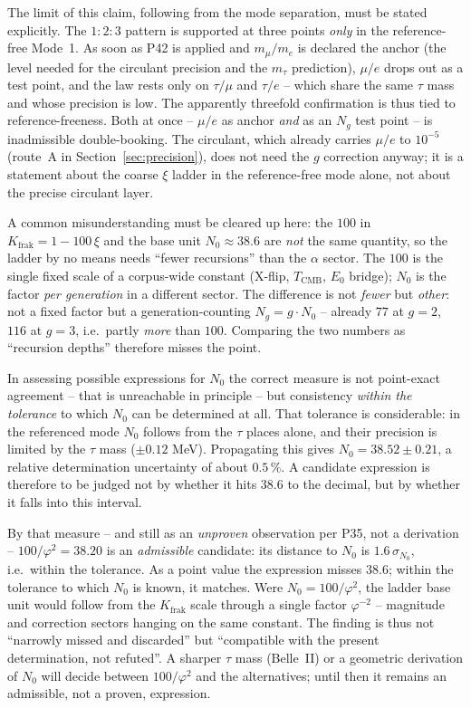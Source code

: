 The limit of this claim, following from the mode separation, must be stated
explicitly. The $1:2:3$ pattern is supported at three points \emph{only} in
the reference-free Mode~1. As soon as P42 is applied and $m_\mu/m_e$ is
declared the anchor (the level needed for the circulant precision and the
$m_\tau$ prediction), $\mu/e$ drops out as a test point, and the law rests
only on $\tau/\mu$ and $\tau/e$ -- which share the same $\tau$ mass and whose
precision is low. The apparently threefold confirmation is thus tied to
reference-freeness. Both at once -- $\mu/e$ as anchor \emph{and} as an
$N_g$ test point -- is inadmissible double-booking. The circulant, which
already carries $\mu/e$ to $10^{-5}$ (route~A in
Section~\ref{sec:precision}), does not need the $g$ correction anyway; it is
a statement about the coarse $\xi$ ladder in the reference-free mode alone,
not about the precise circulant layer.

A common misunderstanding must be cleared up here: the $100$ in
$K_{\text{frak}}=1-100\,\xi$ and the base unit $N_0\approx38.6$ are
\emph{not} the same quantity, so the ladder by no means needs \enquote{fewer
recursions} than the $\alpha$ sector. The $100$ is the single fixed scale of
a corpus-wide constant (X-flip, $T_{\text{CMB}}$, $E_0$ bridge); $N_0$ is the
factor \emph{per generation} in a different sector. The difference is not
\emph{fewer} but \emph{other}: not a fixed factor but a generation-counting
$N_g=g\cdot N_0$ -- already $77$ at $g=2$, $116$ at $g=3$, i.e.\ partly
\emph{more} than $100$. Comparing the two numbers as \enquote{recursion
depths} therefore misses the point.

In assessing possible expressions for $N_0$ the correct measure is not
point-exact agreement -- that is unreachable in principle -- but consistency
\emph{within the tolerance} to which $N_0$ can be determined at all. That
tolerance is considerable: in the referenced mode $N_0$ follows from the
$\tau$ places alone, and their precision is limited by the $\tau$ mass
($\pm0.12$ MeV). Propagating this gives $N_0 = 38.52 \pm 0.21$, a relative
determination uncertainty of about $0.5\,\%$. A candidate expression is
therefore to be judged not by whether it hits $38.6$ to the decimal, but by
whether it falls into this interval.

By that measure -- and still as an \emph{unproven} observation per P35, not
a derivation -- $100/\varphi^2 = 38.20$ is an \emph{admissible} candidate:
its distance to $N_0$ is $1.6\,\sigma_{N_0}$, i.e.\ within the tolerance. As
a point value the expression misses $38.6$; within the tolerance to which
$N_0$ is known, it matches. Were $N_0=100/\varphi^2$, the ladder base unit
would follow from the $K_{\text{frak}}$ scale through a single factor
$\varphi^{-2}$ -- magnitude and correction sectors hanging on the same
constant. The finding is thus not \enquote{narrowly missed and discarded}
but \enquote{compatible with the present determination, not refuted}. A
sharper $\tau$ mass (Belle~II) or a geometric derivation of $N_0$ will decide
between $100/\varphi^2$ and the alternatives; until then it remains an
admissible, not a proven, expression.


